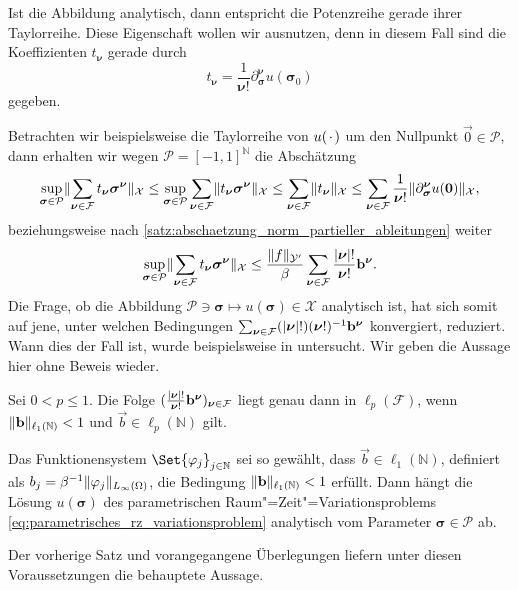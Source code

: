 \documentclass[../main.tex]{subfiles}
\begin{document}
Ist die Abbildung analytisch, dann entspricht die Potenzreihe gerade ihrer Taylorreihe.
Diese Eigenschaft wollen wir ausnutzen, denn in diesem Fall sind die Koeffizienten $t_{\bm \nu}$ gerade durch
\begin{equation}
    t_{\bm \nu} = \frac{1}{\bm\nu!} \partial^{\bm \nu}_{\bm \sigma} u(\bm \sigma_{0})
\end{equation}
gegeben.

Betrachten wir beispielsweise die Taylorreihe von $u({\mkern2mu\cdot\mkern2mu})$ um den Nullpunkt $\vec 0 \in \mathcal P$, dann erhalten wir wegen $\mathcal P = [-1, 1]^{\mathbb{N}}$ die Abschätzung
\begin{equation}
    \sup_{\bm\sigma \in \mathcal P} \lVert\sum_{\bm\nu \in \mathcal F} t_{\bm\nu} \bm\sigma^{\bm\nu}\rVert_{\mathcal X}
    \leq \sup_{\bm\sigma \in \mathcal P} \sum_{\bm\nu \in \mathcal F} \lVert t_{\bm\nu} \bm\sigma^{\bm\nu}\rVert_{\mathcal X}
    \leq \sum_{\bm\nu \in \mathcal F} \lVert t_{\bm\nu}\rVert_{\mathcal X}
    \leq \sum_{\bm \nu \in \mathcal F} \frac{1}{\bm\nu!} \lVert \partial^{\bm \nu}_{\bm \sigma} u(\mathbf{0})\rVert_{\mathcal X},
\end{equation}
beziehungsweise nach \cref{satz:abschaetzung_norm_partieller_ableitungen} weiter
\begin{equation}
    \sup_{\bm\sigma \in \mathcal P} \lVert\sum_{\bm\nu \in \mathcal F} t_{\bm\nu} \bm\sigma^{\bm\nu}\rVert_{\mathcal X}
    \leq \frac{\lVert f\rVert_{\mathcal Y'}}{\beta} \sum_{\bm \nu \in \mathcal F} \frac{\lvert\bm\nu\rvert!}{\bm\nu!} \mathbf{b}^{\bm\nu}.
\end{equation}
Die Frage, ob die Abbildung $\mathcal P \ni \bm \sigma \mapsto u(\bm \sigma) \in \mathcal X$ analytisch ist, hat sich somit auf jene, unter welchen Bedingungen $\sum_{\bm \nu \in \mathcal F} (\lvert\bm\nu\rvert!)(\bm\nu!)^{-1} \mathbf{b}^{\bm\nu}$ konvergiert, reduziert.
Wann dies der Fall ist, wurde beispielsweise in \cite[Theorem 7.2]{Cohen:2010kz} untersucht.
Wir geben die Aussage hier ohne Beweis wieder.

\begin{Satz}
\label{satz:cohen2010kz:theorem72}
    Sei $0 < p \leq 1$.
    Die Folge $(\frac{\lvert\bm\nu\rvert!}{\bm\nu!} \mathbf{b}^{\bm\nu})_{\bm\nu \in \mathcal F}$ liegt genau dann in $\ell_{p}(\mathcal F)$, wenn $\lVert\mathbf{b}\rVert_{\ell_{1}(\mathbb{N})} < 1$ und $\vec b \in \ell_{p}(\mathbb{N})$ gilt.
\end{Satz}

\begin{Satz}
\label{satz:loesungen_analytisch}
    Das Funktionensystem $\Set{\varphi_{j}}_{j \in \mathbb{N}}$ sei so gewählt, dass $\vec b \in \ell_{1}(\mathbb{N})$, definiert als $b_{j} = \beta^{-1} \lVert\varphi_{j}\rVert_{L_{\infty}(\Omega)}$, die Bedingung $\lVert\mathbf{b}\rVert_{\ell_{1}(\mathbb{N})} < 1$ erfüllt.
    Dann hängt die Lösung $u(\bm \sigma)$ des parametrischen Raum"=Zeit"=Variationsproblems \cref{eq:parametrisches_rz_variationsproblem} analytisch vom Parameter $\bm \sigma \in \mathcal P$ ab.

    \begin{Beweis}
        Der vorherige Satz und vorangegangene Überlegungen liefern unter diesen Voraussetzungen die behauptete Aussage.
    \end{Beweis}
\end{Satz}
\end{document}
